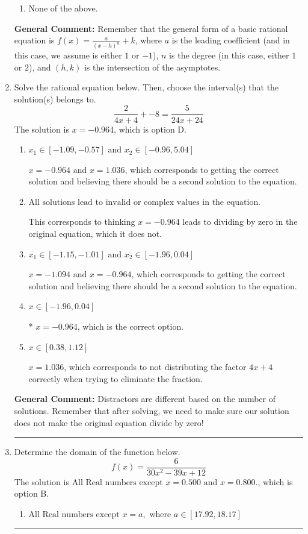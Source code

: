 \documentclass{extbook}[14pt]
\newcommand{\litem}[1]{\item #1

\rule{\textwidth}{0.4pt}}
\begin{document}
\begin{enumerate}
{\begin{enumerate}[label=\Alph*.]
\begin{multicols}{2}
\end{multicols}\item None of the above.\end{enumerate}
\textbf{General Comment:} Remember that the general form of a basic rational equation is $ f(x) = \frac{a}{(x-h)^n} + k$, where $a$ is the leading coefficient (and in this case, we assume is either $1$ or $-1$), $n$ is the degree (in this case, either $1$ or $2$), and $(h, k)$ is the intersection of the asymptotes.
}
\litem{
Solve the rational equation below. Then, choose the interval(s) that the solution(s) belongs to.
\[ \frac{2}{4x + 4} + -8 = \frac{5}{24x + 24} \]The solution is \( x = -0.964 \), which is option D.\begin{enumerate}[label=\Alph*.]
\item \( x_1 \in [-1.09, -0.57] \text{ and } x_2 \in [-0.96,5.04] \)

$x = -0.964 \text{ and } x = 1.036$, which corresponds to getting the correct solution and believing there should be a second solution to the equation.
\item \( \text{All solutions lead to invalid or complex values in the equation.} \)

This corresponds to thinking $x = -0.964$ leads to dividing by zero in the original equation, which it does not.
\item \( x_1 \in [-1.15, -1.01] \text{ and } x_2 \in [-1.96,0.04] \)

$x = -1.094 \text{ and } x = -0.964$, which corresponds to getting the correct solution and believing there should be a second solution to the equation.
\item \( x \in [-1.96,0.04] \)

* $x = -0.964$, which is the correct option.
\item \( x \in [0.38,1.12] \)

$x = 1.036$, which corresponds to not distributing the factor $4x + 4$ correctly when trying to eliminate the fraction.
\end{enumerate}

\textbf{General Comment:} Distractors are different based on the number of solutions. Remember that after solving, we need to make sure our solution does not make the original equation divide by zero!
}
\litem{
Determine the domain of the function below.
\[ f(x) = \frac{6}{30x^{2} -39 x + 12} \]The solution is \( \text{All Real numbers except } x = 0.500 \text{ and } x = 0.800. \), which is option B.\begin{enumerate}[label=\Alph*.]
\item \( \text{All Real numbers except } x = a, \text{ where } a \in [17.92, 18.17] \)


\end{enumerate}}
\end{enumerate}
\end{document}
